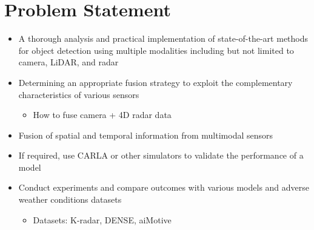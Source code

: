 \documentclass[rnd]{mas_proposal}
\begin{document}
\begin{itemize}
\end{itemize}

\section{Problem Statement}
\begin{itemize}
    
    

    
    \item A thorough analysis and practical implementation of state-of-the-art methods for object detection using multiple modalities including but not limited to camera, LiDAR, and radar
        
    \item Determining an appropriate fusion strategy to exploit the complementary characteristics of various sensors
    \begin{itemize}
        \item How to fuse camera + 4D radar data
    \end{itemize}
    
    \item Fusion of spatial and temporal information from multimodal sensors

    \item If required, use CARLA or other simulators to validate the performance of a model 
    
    \item Conduct experiments and compare outcomes with various models and adverse weather conditions datasets
    \begin{itemize}
        \item Datasets: K-radar\cite{Paek2022Jun}, DENSE\cite{bijelic2020seeing}, aiMotive\cite{Matuszka2022Nov}
    \end{itemize}    


    
\end{itemize}
\end{document}
